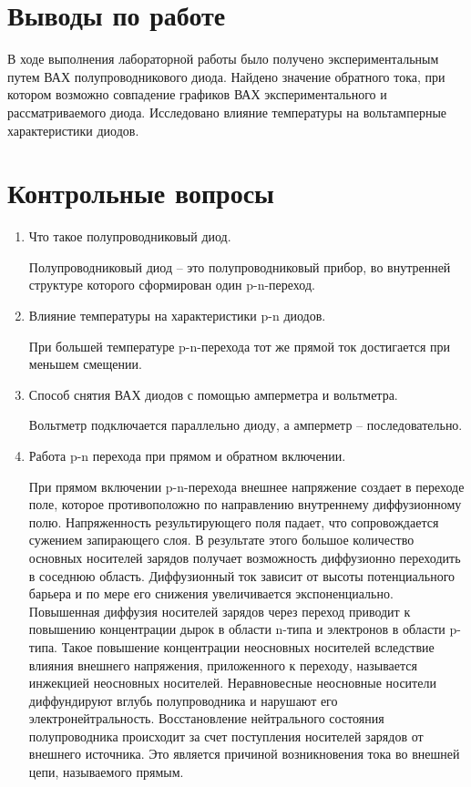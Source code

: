 \documentclass[a4paper,14pt]{article}
\begin{document}
\section{Выводы по работе}

В ходе выполнения лабораторной работы было получено экспериментальным путем ВАХ полупроводникового диода. Найдено значение обратного тока, при котором возможно совпадение графиков ВАХ экспериментального и рассматриваемого диода. Исследовано влияние температуры на вольтамперные характеристики диодов.

\section{Контрольные вопросы}

\begin{enumerate}
	\item Что такое полупроводниковый диод.
	
	Полупроводниковый диод -- это полупроводниковый прибор, во внутренней структуре которого сформирован один p-n-переход.
	
	\item Влияние температуры на характеристики p-n диодов.
	
	При большей температуре p-n-перехода тот же прямой ток достигается при меньшем смещении.
	
	\item Способ снятия ВАХ диодов с помощью амперметра и вольтметра.
	
	Вольтметр подключается параллельно диоду, а амперметр -- последовательно.
	
	\item Работа p-n перехода при прямом и обратном включении.
	
	При прямом включении p-n-перехода внешнее напряжение создает в переходе поле, которое противоположно по направлению внутреннему диффузионному полю. 
	Напряженность результирующего поля падает, что сопровождается сужением запирающего слоя. 
	В результате этого большое количество основных носителей зарядов получает возможность диффузионно переходить в соседнюю область. 
	Диффузионный ток зависит от высоты потенциального барьера и по мере его снижения увеличивается экспоненциально. 
	Повышенная диффузия носителей зарядов через переход приводит к повышению концентрации дырок в области n-типа и электронов в области p-типа.
	Такое повышение концентрации неосновных носителей вследствие влияния внешнего напряжения, приложенного к переходу, называется инжекцией неосновных носителей. 
	Неравновесные неосновные носители диффундируют вглубь полупроводника и нарушают его электронейтральность. 
	Восстановление нейтрального состояния полупроводника происходит за счет поступления носителей зарядов от внешнего источника. 
	Это является причиной возникновения тока во внешней цепи, называемого прямым.
	

\end{enumerate}
\end{document}
